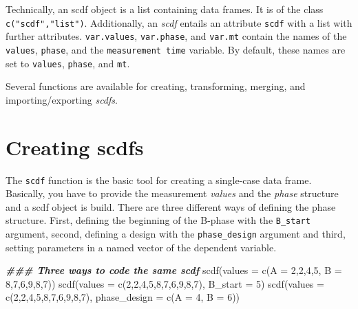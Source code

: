 \documentclass[
]{book}
\makeatletter
\newenvironment{Shaded}{\begin{snugshade}}{\end{snugshade}}
\newcommand{\AttributeTok}[1]{\textcolor[rgb]{0.77,0.63,0.00}{#1}}
\newcommand{\DecValTok}[1]{\textcolor[rgb]{0.00,0.00,0.81}{#1}}
\newcommand{\DocumentationTok}[1]{\textcolor[rgb]{0.56,0.35,0.01}{\textbf{\textit{#1}}}}
\newcommand{\FunctionTok}[1]{\textcolor[rgb]{0.00,0.00,0.00}{#1}}
\newcommand{\NormalTok}[1]{#1}
\newenvironment{kframe}{%
\medskip{}
\setlength{\fboxsep}{.8em}
 \def\at@end@of@kframe{}%
 \ifinner\ifhmode%
  \def\at@end@of@kframe{\end{minipage}}%
  \begin{minipage}{\columnwidth}%
 \fi\fi%
 \def\FrameCommand##1{\hskip\@totalleftmargin \hskip-\fboxsep
 \colorbox{shadecolor}{##1}\hskip-\fboxsep
     \hskip-\linewidth \hskip-\@totalleftmargin \hskip\columnwidth}%
 \MakeFramed {\advance\hsize-\width
   \@totalleftmargin\z@ \linewidth\hsize
   \@setminipage}}%
 {\par\unskip\endMakeFramed%
 \at@end@of@kframe}
\newenvironment{rmdblock}[1]
  {
  \begin{itemize}
  \renewcommand{\labelitemi}{
    \raisebox{-.7\height}[0pt][0pt]{
      {\setkeys{Gin}{width=3em,keepaspectratio}\texttt{[image: images/\#1]}}
    }
  }
  \setlength{\fboxsep}{1em}
  \begin{kframe}
  \item
  }
  {
  \end{kframe}
  \end{itemize}
  }
\newenvironment{rmdnote}
  {\begin{rmdblock}{bulp}}
{\end{rmdblock}}
\makeatother
\begin{document}
\begin{rmdnote}
Technically, an scdf object is a list containing data frames. It is of
the class \texttt{c("scdf","list")}. Additionally, an \emph{scdf}
entails an attribute \texttt{scdf} with a list with further attributes.
\texttt{var.values}, \texttt{var.phase}, and \texttt{var.mt} contain the
names of the \texttt{values}, \texttt{phase}, and the
\texttt{measurement\ time} variable. By default, these names are set to
\texttt{values}, \texttt{phase}, and \texttt{mt}.
\end{rmdnote}

Several functions are available for creating, transforming, merging, and importing/exporting \emph{scdfs}.

\hypertarget{creating-scdfs}{%
\section{Creating scdfs}\label{creating-scdfs}}

The \texttt{scdf} function is the basic tool for creating a single-case data frame. Basically, you have to provide the measurement \emph{values} and the \emph{phase} structure and a scdf object is build. There are three different ways of defining the phase structure. First, defining the beginning of the B-phase with the \texttt{B\_start} argument, second, defining a design with the \texttt{phase\_design} argument and third, setting parameters in a named vector of the dependent variable.

\begin{Shaded}
\begin{Highlighting}[]
\DocumentationTok{\#\#\# Three ways to code the same scdf}
\FunctionTok{scdf}\NormalTok{(}\AttributeTok{values =} \FunctionTok{c}\NormalTok{(}\AttributeTok{A =} \DecValTok{2}\NormalTok{,}\DecValTok{2}\NormalTok{,}\DecValTok{4}\NormalTok{,}\DecValTok{5}\NormalTok{, }\AttributeTok{B =} \DecValTok{8}\NormalTok{,}\DecValTok{7}\NormalTok{,}\DecValTok{6}\NormalTok{,}\DecValTok{9}\NormalTok{,}\DecValTok{8}\NormalTok{,}\DecValTok{7}\NormalTok{))}
\FunctionTok{scdf}\NormalTok{(}\AttributeTok{values =} \FunctionTok{c}\NormalTok{(}\DecValTok{2}\NormalTok{,}\DecValTok{2}\NormalTok{,}\DecValTok{4}\NormalTok{,}\DecValTok{5}\NormalTok{,}\DecValTok{8}\NormalTok{,}\DecValTok{7}\NormalTok{,}\DecValTok{6}\NormalTok{,}\DecValTok{9}\NormalTok{,}\DecValTok{8}\NormalTok{,}\DecValTok{7}\NormalTok{), }\AttributeTok{B\_start =} \DecValTok{5}\NormalTok{)}
\FunctionTok{scdf}\NormalTok{(}\AttributeTok{values =} \FunctionTok{c}\NormalTok{(}\DecValTok{2}\NormalTok{,}\DecValTok{2}\NormalTok{,}\DecValTok{4}\NormalTok{,}\DecValTok{5}\NormalTok{,}\DecValTok{8}\NormalTok{,}\DecValTok{7}\NormalTok{,}\DecValTok{6}\NormalTok{,}\DecValTok{9}\NormalTok{,}\DecValTok{8}\NormalTok{,}\DecValTok{7}\NormalTok{), }\AttributeTok{phase\_design =} \FunctionTok{c}\NormalTok{(}\AttributeTok{A =} \DecValTok{4}\NormalTok{, }\AttributeTok{B =} \DecValTok{6}\NormalTok{))}
\end{Highlighting}
\end{Shaded}
\end{document}
